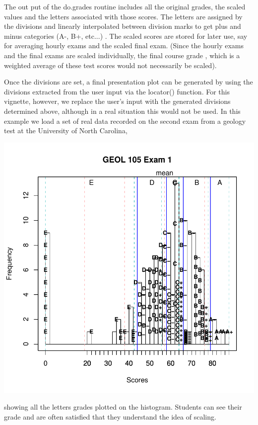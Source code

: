 \documentclass{article}
\begin{document}
The out put of the do.grades routine includes all the original grades,
the scaled values and the letters associated with those 
scores.  The letters are assigned by
the divisions and linearly interpolated between
division marks to get plus and minus categories (A-, B+, etc...) .
The scaled scores are stored for later use, say for averaging 
hourly exams and the scaled final exam.
(Since the hourly exams and the final exams are scaled individually,
the final course grade , which is a weighted average of these
test scores would not necessarily be scaled).

Once the divisions are set,
a final presentation  plot can be generated by using the 
divisions extracted from the user input via the locator() 
function.  For this vignette, however,
we replace the user's input with the 
generated divisions determined above, although in 
a real situation this would not 
be used.  In this example we load a set of real data
recorded on the second exam from a geology test
at the University of North Carolina,
\begin{Schunk}
\end{Schunk}
\includegraphics{grades-004}

showing all the letters grades plotted on the 
histogram.  Students can see their grade and
are often satisfied that they understand the 
idea of scaling.
\end{document}

